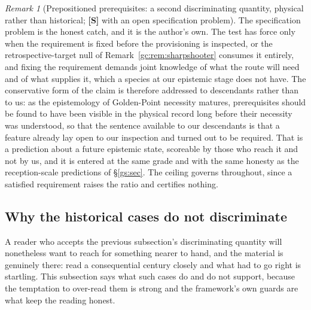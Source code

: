 \documentclass[11pt]{article}
\numberwithin{equation}{section}
\theoremstyle{plain}
\theoremstyle{definition}
\theoremstyle{remark}
\newtheorem{remark}[theorem]{Remark}
\begin{document}
\begin{remark}[Prepositioned prerequisites: a second discriminating
quantity, physical rather than historical; \textbf{[S]} with an open specification problem]
The specification problem is the honest catch, and it is the
author's own. The test has force only when the requirement is fixed
before the provisioning is inspected, or the retrospective-target
null of Remark~\ref{gc:rem:sharpshooter} consumes it entirely, and
fixing the requirement demands joint knowledge of what the route
will need and of what supplies it, which a species at our epistemic
stage does not have. The conservative form of the claim is therefore
addressed to descendants rather than to us: as the epistemology of
Golden-Point necessity matures, prerequisites should be found to
have been visible in the physical record long before their necessity
was understood, so that the sentence available to our descendants is
that a feature already lay open to our inspection and turned out to
be required. That is a prediction about a future epistemic state,
scoreable by those who reach it and not by us, and it is entered at
the same grade and with the same honesty as the reception-scale
predictions of \S\ref{gs:sec}. The ceiling governs throughout, since
a satisfied requirement raises the ratio and certifies nothing.
\end{remark}

\subsection{Why the historical cases do not discriminate}
\label{gc:sub:historicalcases}

A reader who accepts the previous subsection's discriminating quantity
will nonetheless want to reach for something nearer to hand, and the
material is genuinely there: read a consequential century closely and
what had to go right is startling. This subsection says what such cases
do and do not support, because the temptation to over-read them is
strong and the framework's own guards are what keep the reading honest.
\end{document}
